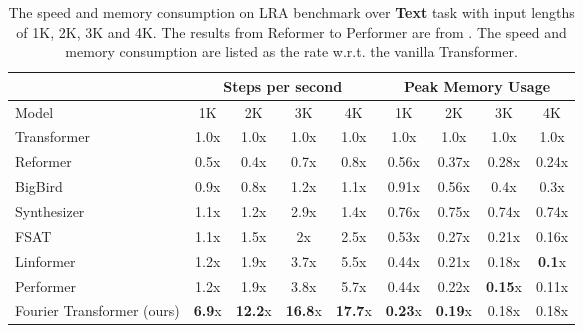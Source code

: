 \documentclass[11pt]{article}
\begin{document}
\begin{table*}[ht]
\centering
\begin{tabular}{@{}l|cccc|cccc@{}}
\toprule
                      & \multicolumn{4}{c|}{Steps per second  }    & \multicolumn{4}{c}{Peak Memory Usage }      \\ \midrule
Model                 & 1K            & 2K               & 3K               & 4K                & 1K               & 2K               & 3K               & 4K               \\ \midrule
Transformer           & 1.0x          & 1.0x             & 1.0x             & 1.0x              & 1.0x             & 1.0x             & 1.0x             & 1.0x             \\ 
Reformer              & 0.5x          & 0.4x             & 0.7x             & 0.8x              & 0.56x            & 0.37x            & 0.28x            & 0.24x            \\ 
BigBird               & 0.9x          & 0.8x             & 1.2x             & 1.1x              & 0.91x            & 0.56x            & 0.4x             & 0.3x             \\ 
Synthesizer           & 1.1x          & 1.2x             & 2.9x             & 1.4x              & 0.76x            & 0.75x            & 0.74x            & 0.74x            \\ 
FSAT                  & 1.1x          & 1.5x             & 2x               & 2.5x              & 0.53x            & 0.27x            & 0.21x            & 0.16x            \\ 
Linformer             & 1.2x          & 1.9x             & 3.7x             & 5.5x              & 0.44x            & 0.21x            & 0.18x            & \textbf{0.1}x             \\ 
Performer             & 1.2x          & 1.9x             & 3.8x             & 5.7x              & 0.44x            & 0.22x            & \textbf{0.15}x            & 0.11x            \\ \midrule
Fourier Transformer (ours) & \textbf{6.9}x & \textbf{12.2}x & \textbf{16.8}x & \textbf{17.7}x & \textbf{0.23}x & \textbf{0.19}x & 0.18x & 0.18x \\ \bottomrule
\end{tabular}
\caption{The speed and memory consumption on LRA benchmark over \textbf{Text} task with input lengths of 1K, 2K, 3K and 4K. The results from Reformer to Performer are from \citet{zhuang2022long}. The speed and memory consumption are listed as the rate w.r.t. the vanilla Transformer.}
\label{tab: lra_time}
\end{table*}
\end{document}
